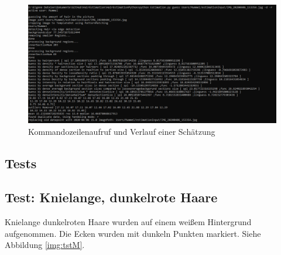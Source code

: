 \documentclass[german,a4paper,12pt]{llncs}
\begin{document}
\begin{figure}
  \centering
  \includegraphics[width=1.2\textwidth]{fig64/commandlineGuessProcess.PNG}
  \caption[]{Kommandozeilenaufruf und Verlauf einer Schätzung}
  \label{img:guess}
\end{figure} 

\subsection{Tests}
\subsection{Test: Knielange, dunkelrote Haare}

Knielange dunkelroten Haare wurden auf einem weißem Hintergrund aufgenommen. Die Ecken wurden mit dunkeln Punkten markiert. Siehe Abbildung \ref{img:tstM}.
\end{document}
